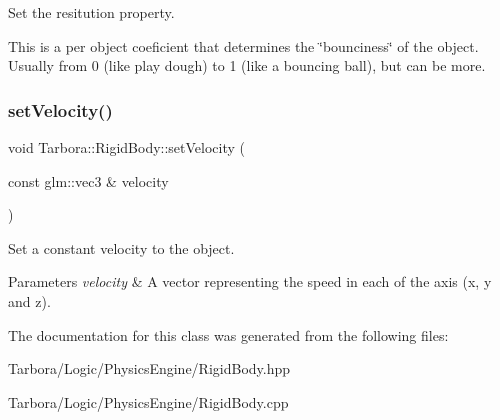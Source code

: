 Set the resitution property. 

This is a per object coeficient that determines the \char`\"{}bounciness\char`\"{} of the object. Usually from 0 (like play dough) to 1 (like a bouncing ball), but can be more. \mbox{\label{classTarbora_1_1RigidBody_aa7191b36165f8c612630ad9ba05707a6}} 
\subsubsection{\texorpdfstring{set\+Velocity()}{setVelocity()}}
{\footnotesize\ttfamily void Tarbora\+::\+Rigid\+Body\+::set\+Velocity (\begin{DoxyParamCaption}\item[{const glm\+::vec3 \&}]{velocity }\end{DoxyParamCaption})}



Set a constant velocity to the object. 


\begin{DoxyParams}{Parameters}
{\em velocity} & A vector representing the speed in each of the axis (x, y and z). \\
\hline
\end{DoxyParams}


The documentation for this class was generated from the following files\+:\begin{DoxyCompactItemize}
\item 
Tarbora/\+Logic/\+Physics\+Engine/Rigid\+Body.\+hpp\item 
Tarbora/\+Logic/\+Physics\+Engine/Rigid\+Body.\+cpp\end{DoxyCompactItemize}
